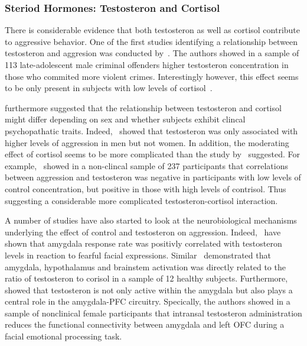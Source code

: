 \subsubsection{Steriod Hormones: Testosteron and Cortisol}
\label{ssub:steriod_hormones_testosteron_and_cortisol}

There is considerable evidence that both testosteron as well as cortisol contribute to aggressive behavior.
One of the first studies identifying a relationship between testosteron and aggresion was conducted by~\citet{Dabbes1991}.
The authors showed in a sample of 113 late-adolescent male criminal offenders higher testosteron concentration in those who commited more violent crimes.
Interestingly however, this effect seems to be only present in subjects with low levels of cortisol~\citet{Popma2007}.

\citet{Rosell2015} furthermore suggested that the relationship between testosteron and cortisol might differ depending on sex and whether subjects exhibit clincal psychopathatic traits.
Indeed,~\citet{Kuepper2010} showed that testosteron was only associated with higher levels of aggression in men but not women.
In addition, the moderating effect of cortisol seems to be more complicated than the study by~\citet{Dabbes1991} suggested.
For example,~\citet{Welker2014} showed in a non-clincal sample of 237 participants that correlations between aggression and testosteron was negative in participants with low levels of control concentration, but positive in those with high levels of contrisol.
Thus suggesting a considerable more complicated testosteron-cortisol interaction.

A number of studies have also started to look at the neurobiological mechanisms underlying the effect of control and testosteron on aggression.
Indeed,~\citet{Derntl2009} have shown that amygdala response rate was positivly correlated with testosteron levels in reaction to fearful facial expressions.
Similar~\citet{Hermans2008} demonstrated that amygdala, hypothalamus and brainstem activation was directly related to the ratio of testosteron to corisol in a sample of 12 healthy subjects.
Furthermore,~\citet{VanWingen2010} showed that testosteron is not only active within the amygdala but also plays a central role in the amygdala-PFC circuitry.
Specically, the authors showed in a sample of nonclinical female participants that intransal testosteron administration reduces the functional connectivity between amygdala and left OFC during a facial emotional processing task.

